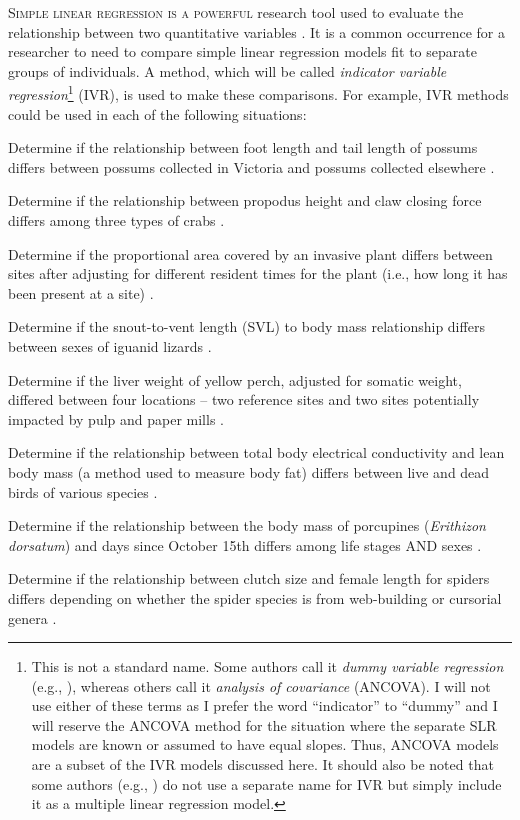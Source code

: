 \documentclass[10pt,openany]{book}\usepackage[]{graphicx}\usepackage[]{color}
\begin{document}
\lettrine{S}{imple linear regression is a powerful} research tool used to evaluate the relationship between two quantitative variables .  It is a common occurrence for a researcher to need to compare simple linear regression models fit to separate groups of individuals.  A method, which will be called \emph{indicator variable regression}\footnote{This is not a standard name.  Some authors call it \emph{dummy variable regression} (e.g., \cite{Fox1997}), whereas others call it \emph{analysis of covariance} (ANCOVA).  I will not use either of these terms as I prefer the word ``indicator'' to ``dummy'' and I will reserve the ANCOVA method for the situation where the separate SLR models are known or assumed to have equal slopes.  Thus, ANCOVA models are a subset of the IVR models discussed here.  It should also be noted that some authors (e.g., \cite{Weisberg2005}) do not use a separate name for IVR but simply include it as a multiple linear regression model.} (IVR), is used to make these comparisons.  For example, IVR methods could be used in each of the following situations:
\begin{Enumerate}
  \item Determine if the relationship between foot length and tail length of possums differs between possums collected in Victoria and possums collected elsewhere \citep{WoodsHellgren2003}.
  \item Determine if the relationship between propodus height and claw closing force differs among three types of crabs \citep{YamadaBoulding1998}.
  \item Determine if the proportional area covered by an invasive plant differs between sites after adjusting for different resident times for the plant (i.e., how long it has been present at a site) \citep{Mullerova2005}.
  \item Determine if the snout-to-vent length (SVL) to body mass relationship differs between sexes of iguanid lizards \citep{VittGoldberg1983}.
  \item Determine if the liver weight of yellow perch, adjusted for somatic weight, differed between four locations -- two reference sites and two sites potentially impacted by pulp and paper mills \citep{KarelsOikari2000}.
  \item Determine if the relationship between total body electrical conductivity and lean body mass (a method used to measure body fat) differs between live and dead birds of various species \citep{Castroetal1990}.
  \item Determine if the relationship between the body mass of porcupines (\emph{Erithizon dorsatum}) and days since October 15th differs among life stages AND sexes \citep{SweitzerBerger1993}.
  \item Determine if the relationship between clutch size and female length for spiders differs depending on whether the spider species is from web-building or cursorial genera \citep{Simpson1995}.
\end{Enumerate}
\end{document}
